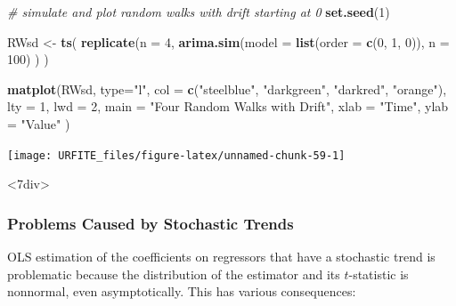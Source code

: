 \documentclass[]{book}
\newenvironment{Shaded}{\begin{snugshade}}{\end{snugshade}}
\newcommand{\KeywordTok}[1]{\textcolor[rgb]{0.13,0.29,0.53}{\textbf{#1}}}
\newcommand{\DataTypeTok}[1]{\textcolor[rgb]{0.13,0.29,0.53}{#1}}
\newcommand{\DecValTok}[1]{\textcolor[rgb]{0.00,0.00,0.81}{#1}}
\newcommand{\StringTok}[1]{\textcolor[rgb]{0.31,0.60,0.02}{#1}}
\newcommand{\CommentTok}[1]{\textcolor[rgb]{0.56,0.35,0.01}{\textit{#1}}}
\newcommand{\NormalTok}[1]{#1}
\theoremstyle{definition}
\theoremstyle{definition}
\theoremstyle{definition}
\theoremstyle{remark}
\begin{document}
\begin{Shaded}
\begin{Highlighting}[]
\CommentTok{# simulate and plot random walks with drift starting at 0 }
\KeywordTok{set.seed}\NormalTok{(}\DecValTok{1}\NormalTok{)}

\NormalTok{RWsd <-}\StringTok{ }\KeywordTok{ts}\NormalTok{(}
  \KeywordTok{replicate}\NormalTok{(}\DataTypeTok{n =} \DecValTok{4}\NormalTok{, }
            \KeywordTok{arima.sim}\NormalTok{(}\DataTypeTok{model =} \KeywordTok{list}\NormalTok{(}\DataTypeTok{order =} \KeywordTok{c}\NormalTok{(}\DecValTok{0}\NormalTok{, }\DecValTok{1}\NormalTok{, }\DecValTok{0}\NormalTok{)), }\DataTypeTok{n =} \DecValTok{100}\NormalTok{)}
\NormalTok{            )}
\NormalTok{  )}

\KeywordTok{matplot}\NormalTok{(RWsd, }
        \DataTypeTok{type=}\StringTok{"l"}\NormalTok{, }
        \DataTypeTok{col =} \KeywordTok{c}\NormalTok{(}\StringTok{"steelblue"}\NormalTok{, }\StringTok{"darkgreen"}\NormalTok{, }\StringTok{"darkred"}\NormalTok{, }\StringTok{"orange"}\NormalTok{), }
        \DataTypeTok{lty =} \DecValTok{1}\NormalTok{, }
        \DataTypeTok{lwd =} \DecValTok{2}\NormalTok{,}
        \DataTypeTok{main =} \StringTok{"Four Random Walks with Drift"}\NormalTok{,}
        \DataTypeTok{xlab =} \StringTok{"Time"}\NormalTok{,}
        \DataTypeTok{ylab =} \StringTok{"Value"}
\NormalTok{        )}
\end{Highlighting}
\end{Shaded}

\begin{center}\texttt{[image: URFITE\_files/figure-latex/unnamed-chunk-59-1]} \end{center}

\textless{}7div\textgreater{}

\subsubsection*{Problems Caused by Stochastic
Trends}\label{problems-caused-by-stochastic-trends}

OLS estimation of the coefficients on regressors that have a stochastic
trend is problematic because the distribution of the estimator and its
\(t\)-statistic is nonnormal, even asymptotically. This has various
consequences:
\end{document}
